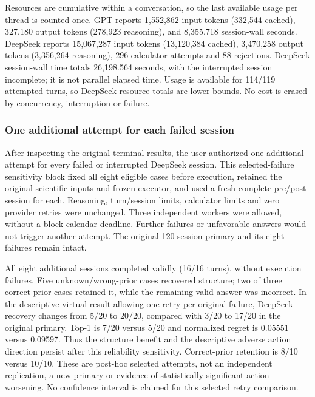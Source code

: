 \documentclass[10pt,twocolumn]{article}
\begin{document}
Resources are cumulative within a conversation, so the last available
usage per thread is counted once. GPT reports 1,552,862 input tokens
(332,544 cached), 327,180 output tokens (278,923 reasoning), and
8,355.718 session-wall seconds. DeepSeek reports 15,067,287 input tokens
(13,120,384 cached), 3,470,258 output tokens (3,356,264 reasoning), 296
calculator attempts and 88 rejections. DeepSeek session-wall time totals
26,198.564 seconds, with the interrupted session incomplete; it is not
parallel elapsed time. Usage is available for 114/119 attempted turns,
so DeepSeek resource totals are lower bounds. No cost is erased by
concurrency, interruption or failure.

\subsubsection{One additional attempt for each failed
session}\label{one-additional-attempt-for-each-failed-session}

After inspecting the original terminal results, the user authorized one
additional attempt for every failed or interrupted DeepSeek session.
This selected-failure sensitivity block fixed all eight eligible cases
before execution, retained the original scientific inputs and frozen
executor, and used a fresh complete pre/post session for each.
Reasoning, turn/session limits, calculator limits and zero provider
retries were unchanged. Three independent workers were allowed, without
a block calendar deadline. Further failures or unfavorable answers would
not trigger another attempt. The original 120-session primary and its
eight failures remain intact.

All eight additional sessions completed validly (16/16 turns), without
execution failures. Five unknown/wrong-prior cases recovered structure;
two of three correct-prior cases retained it, while the remaining valid
answer was incorrect. In the descriptive virtual result allowing one
retry per original failure, DeepSeek recovery changes from 5/20 to
20/20, compared with 3/20 to 17/20 in the original primary. Top-1 is
7/20 versus 5/20 and normalized regret is 0.05551 versus 0.09597. Thus
the structure benefit and the descriptive adverse action direction
persist after this reliability sensitivity. Correct-prior retention is
8/10 versus 10/10. These are post-hoc selected attempts, not an
independent replication, a new primary or evidence of statistically
significant action worsening. No confidence interval is claimed for this
selected retry comparison.
\end{document}

